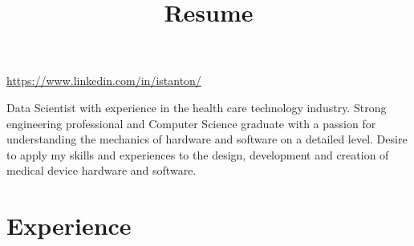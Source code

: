 \documentclass[]{deedy-resume-openfont}
\begin{document}
\title{Resume}
%
%

%
%
\vspace{10pt}

\href{https://www.linkedin.com/in/istanton/}{https://www.linkedin.com/in/istanton/}

\vspace{\topsep}
Data Scientist with experience in the health care technology industry. Strong engineering professional and Computer Science graduate with a passion for understanding the mechanics of hardware and software on a detailed level. Desire to apply my skills and experiences to the design, development and creation of medical device hardware and software.

\section{Experience}
\end{document}
